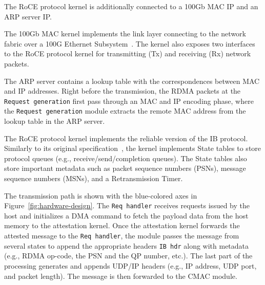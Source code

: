  The RoCE protocol kernel is additionally connected to a 100Gb MAC IP and an ARP server IP. 

 The 100Gb MAC kernel implements the link layer connecting \projecttitle{} to the network fabric over a 100G Ethernet Subsystem~\cite{license}. The kernel also exposes two interfaces to the RoCE protocol kernel for transmitting (Tx) and receiving (Rx) network packets. 

The ARP server contains a lookup table with the correspondences between MAC and IP addresses. Right before the transmission, the RDMA packets at the {\tt Request generation} first pass through an MAC and IP encoding phase, where the {\tt Request generation} module extracts the remote MAC address from the lookup table in the ARP server.

The RoCE protocol kernel implements the reliable version of the IB protocol. Similarly to its original specification~\cite{rdma_specification}, the kernel implements State tables to store protocol queues (e.g., receive/send/completion queues). The State tables also store important metadata such as packet sequence numbers (PSNs), message sequence numbers (MSNs), and a Retransmission Timer. %

The transmission path is shown with the blue-colored axes in Figure~\ref{fig:hardware-design}. The {\tt Req handler} receives requests issued by the host and initializes a DMA command to fetch the payload data from the host memory to the attestation kernel. Once the attestation kernel forwards the attested message to the {\tt Req handler}, the module passes the message from several states to append the appropriate headers {\tt IB hdr} along with metadata (e.g., RDMA op-code, the PSN and the QP number, etc.). The last part of the processing generates and appends UDP/IP headers (e.g., IP address, UDP port, and packet length). The message is then forwarded to the CMAC module. 

